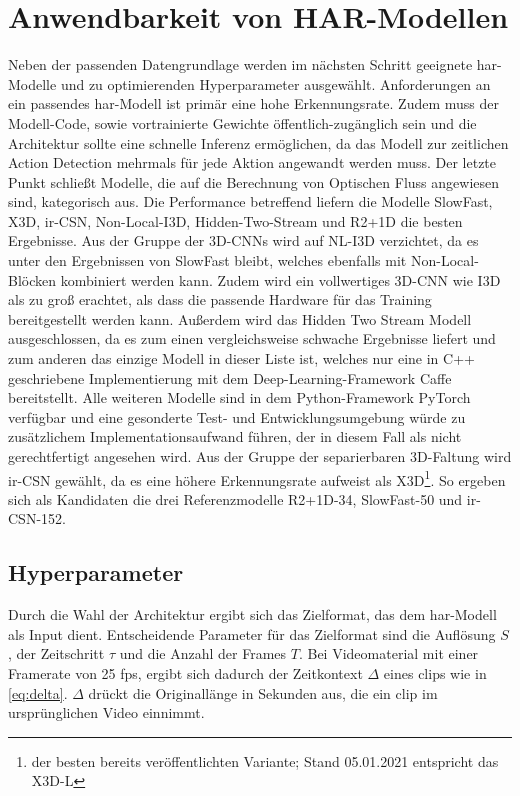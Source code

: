 \section{Anwendbarkeit von HAR-Modellen}
\label{sec:decisions}

Neben der passenden Datengrundlage werden im nächsten Schritt geeignete \gls{har}-Modelle und zu optimierenden Hyperparameter ausgewählt.
Anforderungen an ein passendes \gls{har}-Modell ist primär eine hohe Erkennungsrate.
Zudem muss der Modell-Code, sowie vortrainierte Gewichte öffentlich-zugänglich sein und die Architektur sollte eine schnelle Inferenz ermöglichen, da das Modell zur zeitlichen Action Detection mehrmals für jede Aktion angewandt werden muss.
Der letzte Punkt schließt Modelle, die auf die Berechnung von Optischen Fluss angewiesen sind, kategorisch aus.
Die Performance betreffend liefern die Modelle SlowFast, X3D, ir-CSN, Non-Local-I3D, Hidden-Two-Stream und R2+1D die besten Ergebnisse.
Aus der Gruppe der 3D-CNNs wird auf NL-I3D verzichtet, da es unter den Ergebnissen von SlowFast bleibt, welches ebenfalls mit Non-Local-Blöcken kombiniert werden kann.
Zudem wird ein vollwertiges 3D-CNN wie I3D als zu groß erachtet, als dass die passende Hardware für das Training bereitgestellt werden kann.
Außerdem wird das Hidden Two Stream Modell ausgeschlossen, da es zum einen vergleichsweise schwache Ergebnisse liefert und zum anderen das einzige Modell in dieser Liste ist, welches nur eine in C++ geschriebene Implementierung mit dem Deep-Learning-Framework Caffe~\cite{Jia14} bereitstellt.
Alle weiteren Modelle sind in dem Python-Framework PyTorch~\cite{Paszke19} verfügbar und eine gesonderte Test- und Entwicklungsumgebung würde zu zusätzlichem Implementationsaufwand führen, der in diesem Fall als nicht gerechtfertigt angesehen wird.
Aus der Gruppe der separierbaren 3D-Faltung wird ir-CSN gewählt, da es eine höhere Erkennungsrate aufweist als X3D\footnote{\bzgl der besten bereits veröffentlichten Variante; Stand 05.01.2021 entspricht das X3D-L}.
So ergeben sich als Kandidaten die drei Referenzmodelle R2+1D-34, SlowFast-50 und ir-CSN-152.

\subsection{Hyperparameter}
\label{subsec:hyperparameter}

Durch die Wahl der Architektur ergibt sich das Zielformat, das dem \gls{har}-Modell als Input dient.
Entscheidende Parameter für das Zielformat sind die Auflösung $S$, der Zeitschritt $\tau$ und die Anzahl der Frames $T$.
Bei Videomaterial mit einer Framerate von 25 \gls{fps}, ergibt sich dadurch der Zeitkontext $\Delta$ eines \glspl{clip} wie in \autoref{eq:delta}.
$\Delta$ drückt die Originallänge in Sekunden aus, die ein \gls{clip} im ursprünglichen Video einnimmt.

